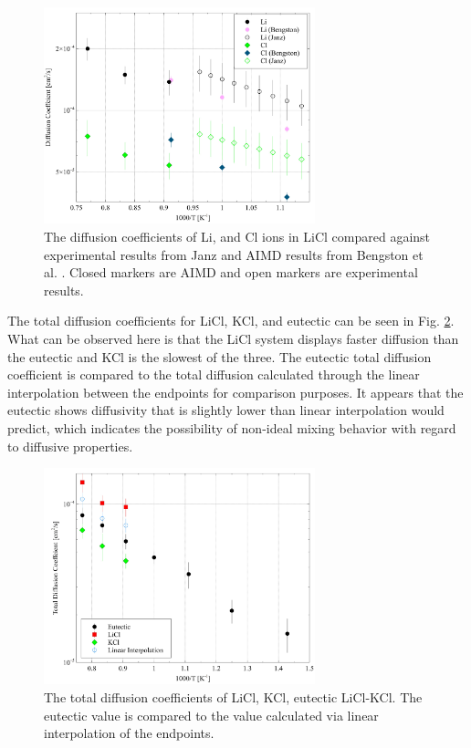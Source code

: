 \documentclass[review]{elsarticle}
\begin{document}
\begin{figure}[h!]
 \centering
\includegraphics[width=0.7\textwidth]{diff_licl.jpg} 
 \caption{The diffusion coefficients of Li, and Cl ions in LiCl compared against experimental results from Janz \cite{janz_Diffusion} and AIMD results from Bengston et al. \cite{Bengston2014}. Closed markers are AIMD and open markers are experimental results.}
 \label{fig:LiCl-diffusion}
\end{figure}


The total diffusion coefficients for LiCl, KCl, and eutectic can be seen in Fig. \ref{fig:likcl_total_diff}. What can be observed here is that the LiCl system displays faster diffusion than the eutectic and KCl is the slowest of the three. The eutectic total diffusion coefficient is compared to the total diffusion calculated through the linear interpolation between the endpoints for comparison purposes. It appears that the eutectic shows diffusivity that is slightly lower than linear interpolation would predict, which indicates the possibility of non-ideal mixing behavior with regard to diffusive properties. 

\begin{figure}[h!]
 \centering
\includegraphics[width=0.7\textwidth]{diff_total_likcl.jpg} 
 \caption{The total diffusion coefficients of LiCl, KCl, eutectic LiCl-KCl. The eutectic value is compared to the value calculated via linear interpolation of the endpoints.}
 \label{fig:likcl_total_diff}
\end{figure}
\FloatBarrier
\end{document}
